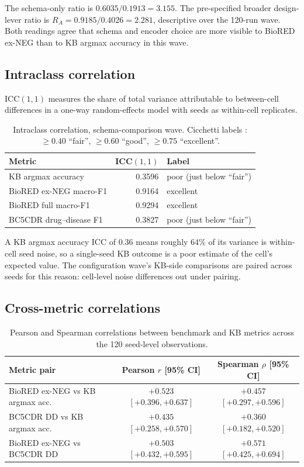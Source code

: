 The schema-only ratio is $0.6035 / 0.1913 = 3.155$. The pre-specified
broader design-lever ratio is
$R_A = 0.9185 / 0.4026 = 2.281$, descriptive over the 120-run wave.
Both readings agree that schema and encoder choice are more visible
to BioRED ex-NEG than to KB argmax accuracy in this wave.

\subsection{Intraclass correlation}

ICC$(1,1)$ measures the share of total variance attributable to
between-cell differences in a one-way random-effects model with
seeds as within-cell replicates.

\begin{table}[H]
\centering
\caption{Intraclass correlation, schema-comparison wave. Cicchetti
labels \citep{cicchetti1994guidelines}: $\ge 0.40$ ``fair'',
$\ge 0.60$ ``good'', $\ge 0.75$ ``excellent''.}
\label{tab:s5-icc}
\small
\begin{tabular}{@{}lrl@{}}
\toprule
\textbf{Metric} & \textbf{ICC$(1,1)$} & \textbf{Label} \\
\midrule
KB argmax accuracy  & 0.3596 & poor (just below ``fair'') \\
BioRED ex-NEG macro-F1      & 0.9164 & excellent \\
BioRED full macro-F1        & 0.9294 & excellent \\
BC5CDR drug--disease F1     & 0.3827 & poor (just below ``fair'') \\
\bottomrule
\end{tabular}
\end{table}

A KB argmax accuracy ICC of 0.36 means roughly 64\% of its
variance is within-cell seed noise, so a single-seed KB outcome is
a poor estimate of the cell's expected value. The configuration
wave's KB-side comparisons are paired across seeds for this reason:
cell-level noise differences out under pairing.

\subsection{Cross-metric correlations}

\begin{table}[H]
\centering
\caption{Pearson and Spearman correlations between benchmark and
KB metrics across the 120 seed-level observations.}
\label{tab:s5-corr}
\small
\begin{tabular}{@{}lcc@{}}
\toprule
\textbf{Metric pair} & \textbf{Pearson $r$ [95\% CI]} & \textbf{Spearman $\rho$ [95\% CI]} \\
\midrule
BioRED ex-NEG vs KB argmax acc.     & $+0.523$ $[+0.396, +0.637]$ & $+0.457$ $[+0.297, +0.596]$ \\
BC5CDR DD vs KB argmax acc.         & $+0.435$ $[+0.258, +0.570]$ & $+0.360$ $[+0.182, +0.520]$ \\
BioRED ex-NEG vs BC5CDR DD     & $+0.503$ $[+0.432, +0.595]$ & $+0.571$ $[+0.425, +0.694]$ \\
\bottomrule
\end{tabular}
\end{table}

